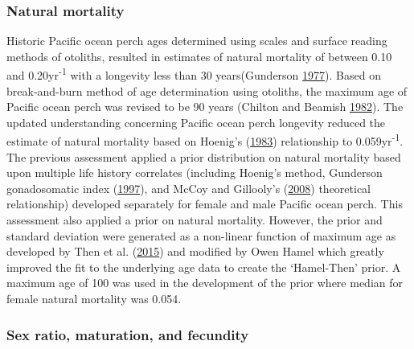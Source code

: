 \documentclass[12pt,]{article}
\begin{document}
\subsubsection{Natural mortality}\label{natural-mortality}

Historic Pacific ocean perch ages determined using scales and surface
reading methods of otoliths, resulted in estimates of natural mortality
of between 0.10 and 0.20yr\textsuperscript{-1} with a longevity less
than 30 years(Gunderson
\protect\hyperlink{ref-gunderson_population_1977}{1977}). Based on
break-and-burn method of age determination using otoliths, the maximum
age of Pacific ocean perch was revised to be 90 years (Chilton and
Beamish \protect\hyperlink{ref-chilton_age_1982}{1982}). The updated
understanding concerning Pacific ocean perch longevity reduced the
estimate of natural mortality based on Hoenig's
(\protect\hyperlink{ref-hoenig_empirical_1983}{1983}) relationship to
0.059yr\textsuperscript{-1}. The previous assessment applied a prior
distribution on natural mortality based upon multiple life history
correlates (including Hoenig's method, Gunderson gonadosomatic index
(\protect\hyperlink{ref-gunderson_trade-off_1997}{1997}), and McCoy and
Gillooly's (\protect\hyperlink{ref-mccoy_predicting_2008}{2008})
theoretical relationship) developed separately for female and male
Pacific ocean perch. This assessment also applied a prior on natural
mortality. However, the prior and standard deviation were generated as a
non-linear function of maximum age as developed by Then et al.
(\protect\hyperlink{ref-then_evaluating_2015}{2015}) and modified by
Owen Hamel which greatly improved the fit to the underlying age data to
create the `Hamel-Then' prior. A maximum age of 100 was used in the
development of the prior where median for female natural mortality was
0.054.

\subsubsection{Sex ratio, maturation, and
fecundity}\label{sex-ratio-maturation-and-fecundity}
\end{document}
